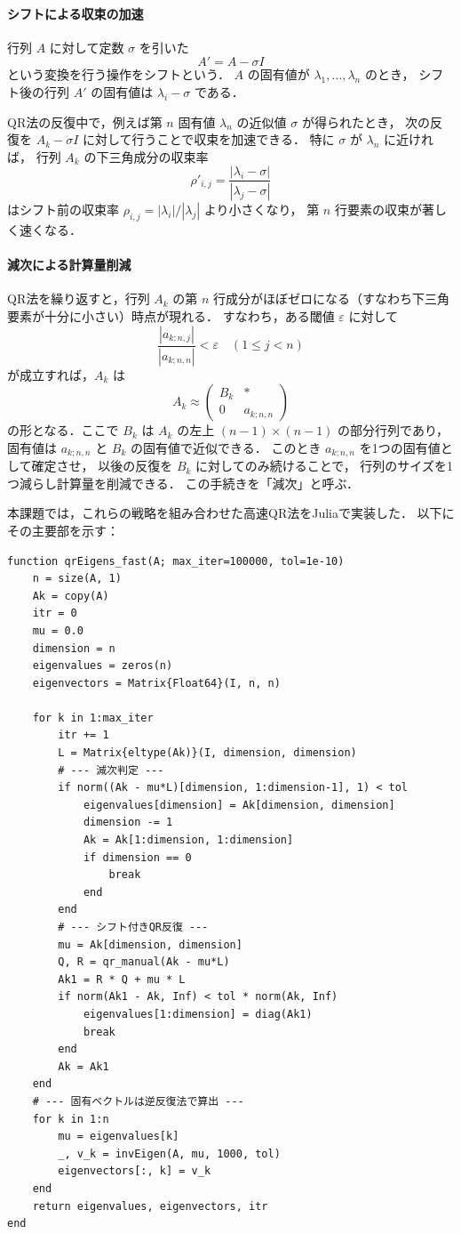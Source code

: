 \documentclass[a4paper,11pt]{ltjsarticle}
\begin{document}
\paragraph{シフトによる収束の加速}
行列 $A$ に対して定数 $\sigma$ を引いた
\[
A' = A - \sigma I
\]
という変換を行う操作をシフトという{\cite{exp2025}}．
$A$ の固有値が $\lambda_{1}, \ldots, \lambda_{n}$ のとき，
シフト後の行列 $A'$ の固有値は $\lambda_{i} - \sigma$ である．

QR法の反復中で，例えば第 $n$ 固有値 $\lambda_{n}$ の近似値 $\sigma$ が得られたとき，
次の反復を $A_{k} - \sigma I$ に対して行うことで収束を加速できる．
特に $\sigma$ が $\lambda_{n}$ に近ければ，
行列 $A_{k}$ の下三角成分の収束率
\[
\rho'_{i,j} = \frac{|\lambda_{i} - \sigma|}{|\lambda_{j} - \sigma|}
\]
はシフト前の収束率 $\rho_{i,j} = |\lambda_{i}| / |\lambda_{j}|$ より小さくなり，
第 $n$ 行要素の収束が著しく速くなる．

\paragraph{減次による計算量削減}
QR法を繰り返すと，行列 $A_{k}$ の第 $n$ 行成分がほぼゼロになる（すなわち下三角要素が十分に小さい）時点が現れる．
すなわち，ある閾値 $\varepsilon$ に対して
\[
\frac{|a_{k;n,j}|}{|a_{k;n,n}|} < \varepsilon \quad (1 \le j < n)
\]
が成立すれば，$A_{k}$ は
\[
A_{k} \approx
\begin{pmatrix}
B_{k} & * \\
0 & a_{k;n,n}
\end{pmatrix}
\]
の形となる．ここで $B_{k}$ は $A_{k}$ の左上 $(n-1)\times(n-1)$ の部分行列であり，
固有値は $a_{k;n,n}$ と $B_{k}$ の固有値で近似できる．
このとき $a_{k;n,n}$ を1つの固有値として確定させ，
以後の反復を $B_{k}$ に対してのみ続けることで，
行列のサイズを1つ減らし計算量を削減できる{\cite{exp2025}}．
この手続きを「減次」と呼ぶ．


本課題では，これらの戦略を組み合わせた高速QR法をJuliaで実装した．
以下にその主要部を示す：

\begin{verbatim}
function qrEigens_fast(A; max_iter=100000, tol=1e-10)
    n = size(A, 1)
    Ak = copy(A)
    itr = 0
    mu = 0.0
    dimension = n
    eigenvalues = zeros(n)
    eigenvectors = Matrix{Float64}(I, n, n)

    for k in 1:max_iter
        itr += 1
        L = Matrix{eltype(Ak)}(I, dimension, dimension)
        # --- 減次判定 ---
        if norm((Ak - mu*L)[dimension, 1:dimension-1], 1) < tol
            eigenvalues[dimension] = Ak[dimension, dimension]
            dimension -= 1
            Ak = Ak[1:dimension, 1:dimension]
            if dimension == 0
                break
            end
        end
        # --- シフト付きQR反復 ---
        mu = Ak[dimension, dimension]
        Q, R = qr_manual(Ak - mu*L)
        Ak1 = R * Q + mu * L
        if norm(Ak1 - Ak, Inf) < tol * norm(Ak, Inf)
            eigenvalues[1:dimension] = diag(Ak1)
            break
        end
        Ak = Ak1
    end
    # --- 固有ベクトルは逆反復法で算出 ---
    for k in 1:n
        mu = eigenvalues[k]
        _, v_k = invEigen(A, mu, 1000, tol)
        eigenvectors[:, k] = v_k
    end
    return eigenvalues, eigenvectors, itr
end
\end{verbatim}
\end{document}
